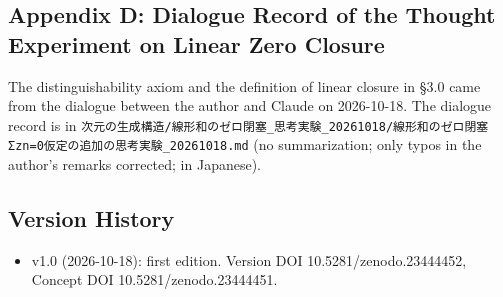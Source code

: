 \documentclass[
  a4paper,
]{article}
\providecommand{\tightlist}{%
  \setlength{\itemsep}{0pt}\setlength{\parskip}{0pt}}
\begin{document}
\subsection{Appendix D: Dialogue Record of the Thought Experiment on
Linear Zero
Closure}\label{appendix-d-dialogue-record-of-the-thought-experiment-on-linear-zero-closure}

The distinguishability axiom and the definition of linear closure in
§3.0 came from the dialogue between the author and Claude on 2026-10-18.
The dialogue record is in
\texttt{次元の生成構造/\allowbreak{}線形和のゼロ閉塞\_\allowbreak{}思考実験\_\allowbreak{}20261018/\allowbreak{}線形和のゼロ閉塞Σzn=0仮定の追加の思考実験\_\allowbreak{}20261018.md}
(no summarization; only typos in the author's remarks corrected; in
Japanese).

\subsection{Version History}\label{version-history}

\begin{itemize}
\tightlist
\item
  v1.0 (2026-10-18): first edition. Version DOI 10.5281/zenodo.23444452,
  Concept DOI 10.5281/zenodo.23444451.
\end{itemize}
\end{document}
